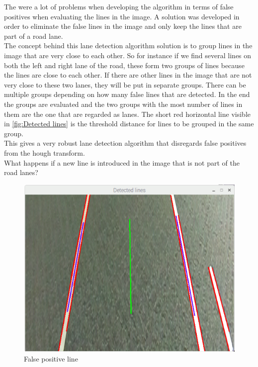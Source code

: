 The were a lot of problems when developing the algorithm in terms of false positives when evaluating the lines in the image. A solution was developed in order to eliminate the false lines in the image and only keep the lines that are part of a road lane.\\

The concept behind this lane detection algorithm solution is to group lines in the image that are very close to each other. So for instance if we find several lines on both the left and right lane of the road, these form two groups of lines because the lines are close to each other. If there are other lines in the image that are not very close to these two lanes, they will be put in separate groups. There can be multiple groups depending on how many false lines that are detected. In the end the groups are evaluated and the two groups with the most number of lines in them are the one that are regarded as lanes. The short red horizontal line visible in \ref{fig:Detected lines} is the threshold distance for lines to be grouped in the same group.\\

This gives a very robust lane detection algorithm that disregards false positives from the hough transform.\\

What happens if a new line is introduced in the image that is not part of the road lanes?

\begin{figure}[H]
  \includegraphics[width=\textwidth]{./img/falsepositive.png}
  \centering
  \caption{False positive line}
  \label{fig:angle}
\end{figure}

